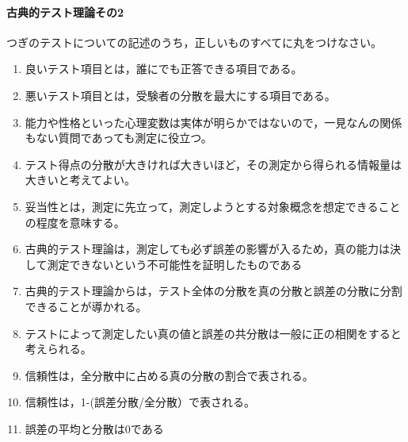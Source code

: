 \documentclass{ltjbook}
\begin{document}
\paragraph{古典的テスト理論その2}つぎのテストについての記述のうち，正しいものすべてに丸をつけなさい。
\begin{enumerate}
	\item 良いテスト項目とは，誰にでも正答できる項目である。
	\item 悪いテスト項目とは，受験者の分散を最大にする項目である。
	\item 能力や性格といった心理変数は実体が明らかではないので，一見なんの関係もない質問であっても測定に役立つ。
	\item テスト得点の分散が大きければ大きいほど，その測定から得られる情報量は大きいと考えてよい。
	\item 妥当性とは，測定に先立って，測定しようとする対象概念を想定できることの程度を意味する。
	\item 古典的テスト理論は，測定しても必ず誤差の影響が入るため，真の能力は決して測定できないという不可能性を証明したものである
	\item 古典的テスト理論からは，テスト全体の分散を真の分散と誤差の分散に分割できることが導かれる。
	\item テストによって測定したい真の値と誤差の共分散は一般に正の相関をすると考えられる。
	\item 信頼性は，全分散中に占める真の分散の割合で表される。
	\item 信頼性は，1-(誤差分散/全分散）で表される。
	\item 誤差の平均と分散は0である
\end{enumerate}
\end{document}
